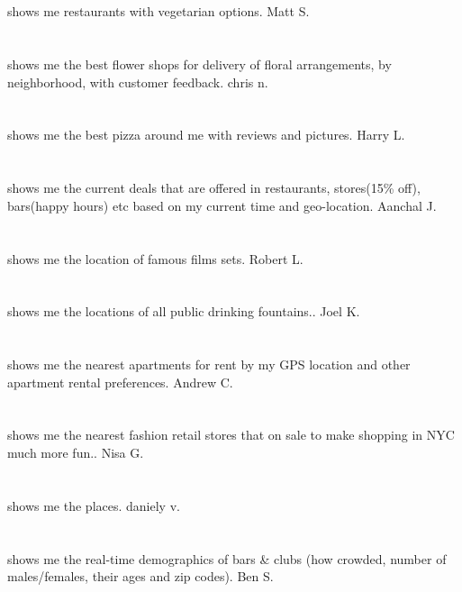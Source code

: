 \section{}shows me restaurants with vegetarian options. Matt S.
\section{} shows me the best flower shops for delivery of floral arrangements,  by neighborhood,  with customer feedback. chris n.
\section{}shows me the best pizza around me with reviews and pictures. Harry L.
\section{}shows me the current deals that are offered in restaurants,  stores(15\% off),  bars(happy hours) etc based on my current time and geo-location. Aanchal J.
\section{}shows me the location of famous films sets. Robert L.
\section{}shows me the locations of all public drinking fountains.. Joel K.
\section{}shows me the nearest apartments for rent by my GPS location and other apartment rental preferences. Andrew C.
\section{}shows me the nearest fashion retail stores that on sale to make shopping in NYC much more fun.. Nisa G.
\section{}shows me the places. daniely v.
\section{} shows me the real-time demographics of bars \& clubs (how crowded,  number of males/females,  their ages and zip codes). Ben  S.
